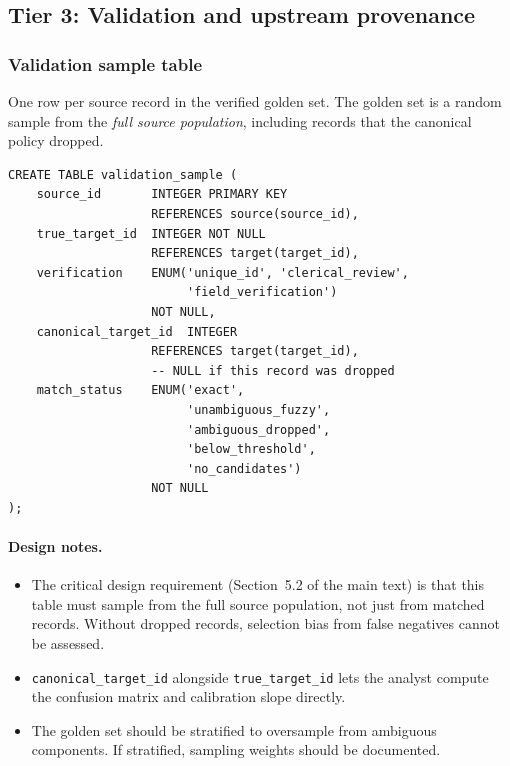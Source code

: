 \subsection{Tier 3: Validation and upstream provenance}

\subsubsection{Validation sample table}

One row per source record in the verified golden set. The golden set is a random sample from the \emph{full source population}, including records that the canonical policy dropped.

\begin{lstlisting}[style=sql]
CREATE TABLE validation_sample (
    source_id       INTEGER PRIMARY KEY
                    REFERENCES source(source_id),
    true_target_id  INTEGER NOT NULL
                    REFERENCES target(target_id),
    verification    ENUM('unique_id', 'clerical_review',
                         'field_verification')
                    NOT NULL,
    canonical_target_id  INTEGER
                    REFERENCES target(target_id),
                    -- NULL if this record was dropped
    match_status    ENUM('exact',
                         'unambiguous_fuzzy',
                         'ambiguous_dropped',
                         'below_threshold',
                         'no_candidates')
                    NOT NULL
);
\end{lstlisting}

\paragraph{Design notes.}
\begin{itemize}
    \item The critical design requirement (Section~5.2 of the main text) is that this table must sample from the full source population, not just from matched records. Without dropped records, selection bias from false negatives cannot be assessed.
    \item \texttt{canonical\_target\_id} alongside \texttt{true\_target\_id} lets the analyst compute the confusion matrix and calibration slope directly.
    \item The golden set should be stratified to oversample from ambiguous components. If stratified, sampling weights should be documented.
\end{itemize}

